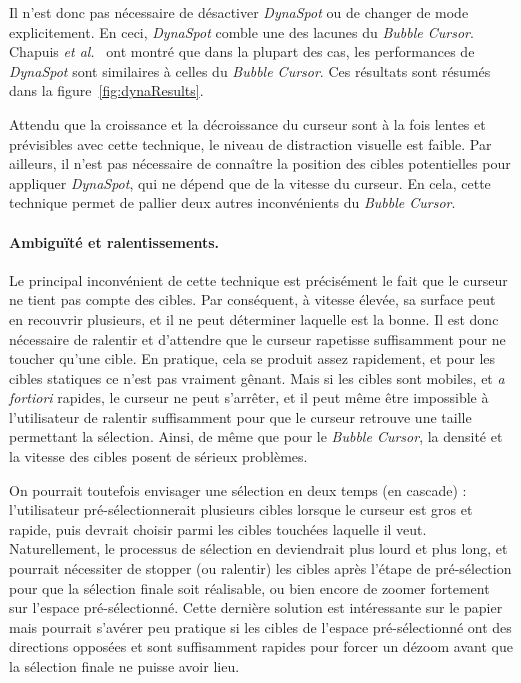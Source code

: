 	Il n'est donc pas nécessaire de désactiver \emph{DynaSpot} ou de changer de mode explicitement. En ceci, \emph{DynaSpot} comble une des lacunes du \emph{Bubble Cursor}. Chapuis \emph{et al.}~\cite{chapuis2009dynaspot} ont montré que dans la plupart des cas, les performances de \emph{DynaSpot} sont similaires à celles du \emph{Bubble Cursor}. Ces résultats sont résumés dans la figure~\ref{fig:dynaResults}.

	Attendu que la croissance et la décroissance du curseur sont à la fois lentes et prévisibles avec cette technique, le niveau de distraction visuelle est faible. Par ailleurs, il n'est pas nécessaire de connaître la position des cibles potentielles pour appliquer \emph{DynaSpot}, qui ne dépend que de la vitesse du curseur. En cela, cette technique permet de pallier deux autres inconvénients du \emph{Bubble Cursor}.

	\paragraph{Ambiguïté et ralentissements.}
	Le principal inconvénient de cette technique est précisément le fait que le curseur ne tient pas compte des cibles. Par conséquent, à vitesse élevée, sa surface peut en recouvrir plusieurs, et il ne peut déterminer laquelle est la bonne. Il est donc nécessaire de ralentir et d'attendre que le curseur rapetisse suffisamment pour ne toucher qu'une cible. En pratique, cela se produit assez rapidement, et pour les cibles statiques ce n'est pas vraiment gênant. Mais si les cibles sont mobiles, et \emph{a fortiori} rapides, le curseur ne peut s'arrêter, et il peut même être impossible à l'utilisateur de ralentir suffisamment pour que le curseur retrouve une taille permettant la sélection. Ainsi, de même que pour le \emph{Bubble Cursor}, la densité et la vitesse des cibles posent de sérieux problèmes.

	On pourrait toutefois envisager une sélection en deux temps (en cascade) : l'utilisateur pré-sélectionnerait plusieurs cibles lorsque le curseur est gros et rapide, puis devrait choisir parmi les cibles touchées laquelle il veut. Naturellement, le processus de sélection en deviendrait plus lourd et plus long, et pourrait nécessiter de stopper (ou ralentir) les cibles après l'étape de pré-sélection pour que la sélection finale soit réalisable, ou bien encore de zoomer fortement sur l'espace pré-sélectionné. Cette dernière solution est intéressante sur le papier mais pourrait s'avérer peu pratique si les cibles de l'espace pré-sélectionné ont des directions opposées et sont suffisamment rapides pour forcer un \og dézoom \fg{} avant que la sélection finale ne puisse avoir lieu.

